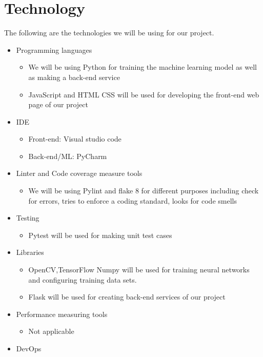 \documentclass[12pt,letterpaper]{article}
\begin{document}
\section{Technology}
The following are the technologies we will be using for our project.
\begin{itemize}
    \item Programming languages
    \begin{itemize}
        \item We will be using Python for training the machine learning model as
        well as making a back-end service 
        \item JavaScript and HTML CSS will be used for developing the front-end
        web page of our project
    \end{itemize}
    \item IDE
    \begin{itemize}
        \item Front-end: Visual studio code
        \item Back-end/ML: PyCharm
    \end{itemize}
    \item Linter and Code coverage measure tools
    \begin{itemize}
        \item We will be using Pylint and flake 8 for different purposes
        including check for errors, tries to enforce a coding standard, looks
        for code smells
    \end{itemize}
    \item Testing
    \begin{itemize}
        \item Pytest will be used for making unit test cases
    \end{itemize}
    \item Libraries
    \begin{itemize}
        \item OpenCV,TensorFlow Numpy will be used for training neural networks
        and configuring training data sets.
        \item Flask will be used for creating back-end services of our project
    \end{itemize}
    \item Performance measuring tools
    \begin{itemize}
        \item Not applicable
    \end{itemize}
    \item DevOps

\end{itemize}
\end{document}
